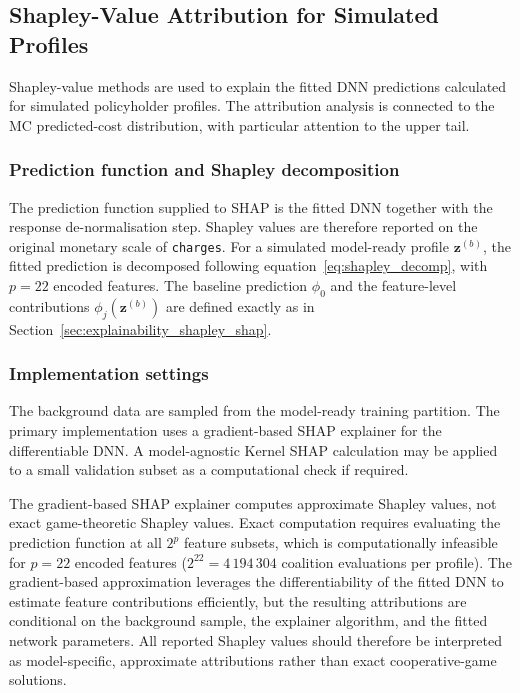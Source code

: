 \subsection{Shapley-Value Attribution for Simulated Profiles}
\label{sec:shapley_attribution_simulated_profiles}
\label{sec:shapley_interpretation_design}
\label{sec:high_cost_conditional_shapley}

Shapley-value methods are used to explain the fitted DNN predictions
calculated for simulated policyholder profiles. The attribution analysis is
connected to the MC predicted-cost distribution, with particular
attention to the upper tail.

\subsubsection{Prediction function and Shapley decomposition}

The prediction function supplied to SHAP is the fitted DNN
together with the response de-normalisation step. Shapley values are
therefore reported on the original monetary scale of \texttt{charges}. For a
simulated model-ready profile $\mathbf{z}^{(b)}$, the fitted prediction is
decomposed following equation~\eqref{eq:shapley_decomp}, with $p = 22$
encoded features. The baseline prediction $\phi_0$ and the feature-level
contributions $\phi_j(\mathbf{z}^{(b)})$ are defined exactly as in
Section~\ref{sec:explainability_shapley_shap}.

\subsubsection{Implementation settings}

The background data are sampled from the model-ready training partition. The
primary implementation uses a gradient-based SHAP explainer for the
differentiable DNN. A model-agnostic Kernel SHAP calculation may be
applied to a small validation subset as a computational check if required.

The gradient-based SHAP explainer computes
approximate Shapley values, not exact game-theoretic Shapley
values.  Exact computation requires evaluating the prediction function at
all $2^p$ feature subsets, which is computationally infeasible for $p = 22$
encoded features ($2^{22} = 4\,194\,304$ coalition evaluations per
profile).  The gradient-based approximation leverages the differentiability
of the fitted DNN to estimate feature contributions efficiently, but
the resulting attributions are conditional on the background sample, the
explainer algorithm, and the fitted network parameters.  All reported
Shapley values should therefore be interpreted as model-specific,
approximate attributions rather than exact cooperative-game solutions.

